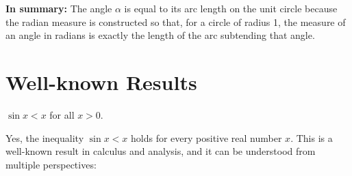 \documentclass[a4paper,12pt]{book}
\begin{document}
\textbf{In summary:}\newline
The angle \(\alpha\) is equal to its arc length on the unit circle because the radian measure is constructed so that, for a circle of radius 1, the measure of an angle in radians is exactly the length of the arc subtending that angle.

\section{Well-known Results}

\begin{bluebox}
\(\sin x < x\) for all \(x>0\).
\end{bluebox}


Yes, the inequality \(\sin x < x\) holds for every positive real number \(x.\) This is a well-known result in calculus and analysis, and it can be understood from multiple perspectives:
\end{document}

